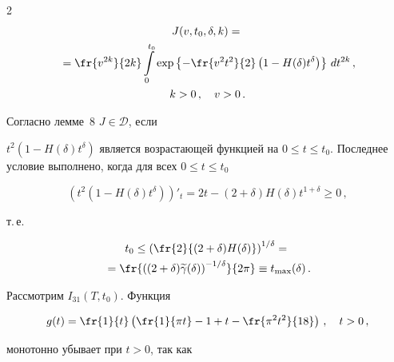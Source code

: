 \begin{multicols}{2}
\begin{multline*}


J(v,t_0,\delta,k)={}\\


{}= \fr{v^{2k}}{2k}\int\limits_0^{t_0}


\exp\left\{-\fr{v^2t^2}{2}\left(1-H(\delta)t^{\delta}\right) \right\}


\,dt^{2k}\,,\\


 k>0\,,\quad v>0\,.


\end{multline*}





Согласно лемме~8 $J\in\mathcal D$, если


$t^2\left(1-H(\delta)t^{\delta}\right)$ является возрастающей функцией на $0\le t\le


t_0$. Последнее условие выполнено, когда для всех $0\le t\le t_0$


$$


\left(t^2(1-H(\delta)t^{\delta})\right)'_t= 2t-(2+\delta)H(\delta)t^{1+\delta}\ge0\,,


$$


т.\,е.\





\noindent


\begin{multline*}


t_0\le \left(\fr{2}{(2+\delta)H(\delta)}\right)^{1/\delta}


={}\\


{}=


\fr{\left((2+\delta)\widetilde \gamma(\delta)


\right)^{-1/\delta}}{2\pi}\equiv t_{\max}(\delta)\,.


\end{multline*}





Рассмотрим $I_{31}(T,t_0).$ Функция


$$


g(t)=\fr{1}{t}\left(\fr{1}{\pi t}-1+t-\fr{\pi^2t^2}{18}\right)\,,\quad


t>0\,,


$$


монотонно убывает при $t>0$, так как


\begin{multline*}



\end{multline*}
\end{multicols}
